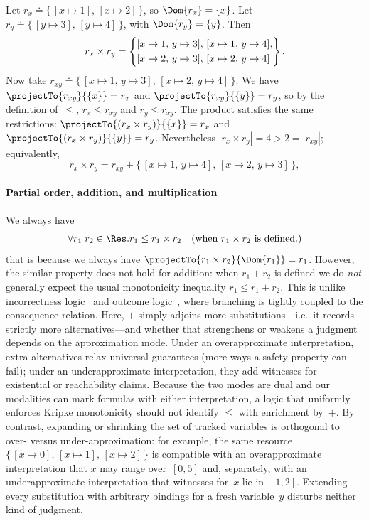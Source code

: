 \begin{example}
Let $r_x \doteq \{\,[x \mapsto 1],\, [x \mapsto 2]\,\}$, so
$\Dom{r_x} = \{x\}$.
Let $r_y \doteq \{\,[y \mapsto 3],\, [y \mapsto 4]\,\}$, with $\Dom{r_y} = \{y\}$.
Then
\[
  r_x \times r_y
  = \left\{
    \begin{array}{@{}l@{}}
      [x \mapsto 1,\, y \mapsto 3],\,
      [x \mapsto 1,\, y \mapsto 4],\\[\jot]
      [x \mapsto 2,\, y \mapsto 3],\,
      [x \mapsto 2,\, y \mapsto 4]
    \end{array}
  \right\}.
\]
Now take
$r_{xy} \doteq \{\, [x \mapsto 1,\, y \mapsto 3],\, [x \mapsto 2,\, y \mapsto 4]\,\}$.
We have
$\projectTo{r_{xy}}{\{x\}} = r_x$ and $\projectTo{r_{xy}}{\{y\}} = r_y$,
so by the definition of~$\leq$,
$r_x \leq r_{xy}$ and $r_y \leq r_{xy}$.
The product satisfies the same restrictions:
$\projectTo{(r_x \times r_y)}{\{x\}} = r_x$ and
$\projectTo{(r_x \times r_y)}{\{y\}} = r_y$.
Nevertheless $|r_x \times r_y| = 4 > 2 = |r_{xy}|$; equivalently,
\[
  r_x \times r_y
  = r_{xy} + \{\, [x \mapsto 1,\, y \mapsto 4],\, [x \mapsto 2,\, y \mapsto 3] \,\},
\]
\end{example}

\paragraph{Partial order, addition, and multiplication} We always have
\begin{align*}
  \forall r_1\;r_2 \in \Res. r_1 \leq r_1 \times r_2 \quad (\text{when } r_1 \times r_2 \text{ is defined.})
\end{align*}
that is because we always have $\projectTo{r_1 \times r_2}{\Dom{r_1}} = r_1$. However, the similar property does not hold for addition: when $r_1 + r_2$ is defined we do \emph{not}
generally expect the usual monotonicity inequality
$r_1 \leq r_1 + r_2$.
This is unlike incorrectness logic~\cite{OHP19} and outcome
logic~\cite{ZDS23,Zil25TOPLAS}, where branching is tightly coupled to
the consequence relation.
Here, $+$ simply adjoins more substitutions---i.e.\ it records strictly
more alternatives---and whether that strengthens or weakens a
judgment depends on the approximation mode.
Under an overapproximate interpretation, extra alternatives relax universal
guarantees (more ways a safety property can fail); under an
underapproximate interpretation, they add witnesses for existential or
reachability claims.
Because the two modes are dual and our modalities can mark formulas
with either interpretation, a logic that uniformly enforces Kripke monotonicity
should not identify $\leq$ with enrichment by~$+$.
By contrast, expanding or shrinking the set of tracked variables is
orthogonal to over- versus under-approximation: for example, the same
resource
$\{\,[x \mapsto 0],\, [x \mapsto 1],\, [x \mapsto 2]\,\}$
is compatible with an overapproximate interpretation that $x$ may range
over~$[0,5]$ and, separately, with an underapproximate interpretation that
witnesses for~$x$ lie in~$[1,2]$.
Extending every substitution with arbitrary bindings for a fresh
variable~$y$ disturbs neither kind of judgment.

